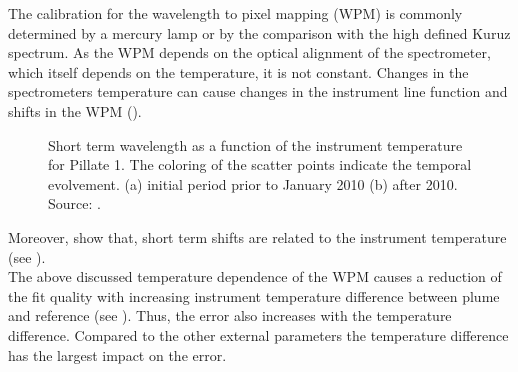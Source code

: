 The calibration for the wavelength to pixel mapping (WPM) is commonly determined by a mercury lamp or by the comparison with the high defined Kuruz spectrum.
As the WPM depends on the optical alignment of the spectrometer, which itself depends on the temperature, it is not constant.
Changes in the spectrometers temperature can cause changes in the instrument line function and shifts in the WPM (\citep{pinardi2007influence}). 
\begin{figure}		
	\caption{Short term wavelength as a function of the instrument temperature for Pillate 1. The coloring of the scatter points indicate the temporal evolvement. (a) initial period prior to January 2010 (b) after 2010. Source: \cite{WarnachSimon}.}
	\label{fig:shorttermshift}
\end{figure}
Moreover, \cite{WarnachSimon} show that, short term shifts are related to the instrument temperature (see ).\\
The above discussed temperature dependence of the WPM causes a reduction of the fit quality with increasing instrument temperature difference between plume and reference (see ). Thus, the  error also increases with the temperature difference.
Compared to the other external parameters the temperature difference has the largest impact on the  error.\\
\\
